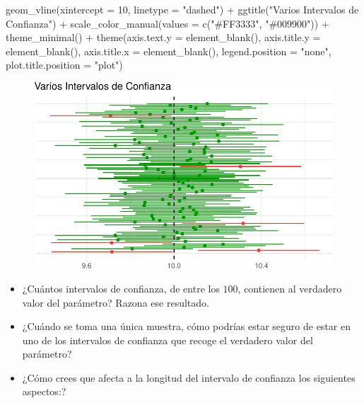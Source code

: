 \documentclass[
  letterpaper,
  DIV=11,
  numbers=noendperiod]{scrreprt}
\newenvironment{Shaded}{\begin{snugshade}}{\end{snugshade}}
\newcommand{\AttributeTok}[1]{\textcolor[rgb]{0.40,0.45,0.13}{#1}}
\newcommand{\DecValTok}[1]{\textcolor[rgb]{0.68,0.00,0.00}{#1}}
\newcommand{\FunctionTok}[1]{\textcolor[rgb]{0.28,0.35,0.67}{#1}}
\newcommand{\NormalTok}[1]{\textcolor[rgb]{0.00,0.23,0.31}{#1}}
\newcommand{\SpecialCharTok}[1]{\textcolor[rgb]{0.37,0.37,0.37}{#1}}
\newcommand{\StringTok}[1]{\textcolor[rgb]{0.13,0.47,0.30}{#1}}
\providecommand{\tightlist}{%
  \setlength{\itemsep}{0pt}\setlength{\parskip}{0pt}}\usepackage{longtable,booktabs,array}
\begin{document}
\begin{tcolorbox}
\begin{Shaded}
\begin{Highlighting}[]
  \FunctionTok{geom\_vline}\NormalTok{(}\AttributeTok{xintercept =} \DecValTok{10}\NormalTok{, }\AttributeTok{linetype =} \StringTok{"dashed"}\NormalTok{) }\SpecialCharTok{+}
  \FunctionTok{ggtitle}\NormalTok{(}\StringTok{"Varios Intervalos de Confianza"}\NormalTok{) }\SpecialCharTok{+}
  \FunctionTok{scale\_color\_manual}\NormalTok{(}\AttributeTok{values =} \FunctionTok{c}\NormalTok{(}\StringTok{"\#FF3333"}\NormalTok{, }\StringTok{"\#009900"}\NormalTok{)) }\SpecialCharTok{+}
  \FunctionTok{theme\_minimal}\NormalTok{() }\SpecialCharTok{+}
  \FunctionTok{theme}\NormalTok{(}\AttributeTok{axis.text.y =} \FunctionTok{element\_blank}\NormalTok{(), }
        \AttributeTok{axis.title.y =} \FunctionTok{element\_blank}\NormalTok{(),}
        \AttributeTok{axis.title.x =} \FunctionTok{element\_blank}\NormalTok{(),}
        \AttributeTok{legend.position =} \StringTok{"none"}\NormalTok{,}
        \AttributeTok{plot.title.position =} \StringTok{"plot"}\NormalTok{)}
\end{Highlighting}
\end{Shaded}

\begin{figure}[H]

{\centering \includegraphics{para_files/figure-pdf/ic1-1.pdf}

}

\end{figure}

\begin{itemize}
\tightlist
\item
  ¿Cuántos intervalos de confianza, de entre los \(100\), contienen al
  verdadero valor del parámetro? Razona ese resultado.
\item
  ¿Cuándo se toma una única muestra, cómo podrías estar seguro de estar
  en uno de los intervalos de confianza que recoge el verdadero valor
  del parámetro?
\item
  ¿Cómo crees que afecta a la longitud del intervalo de confianza los
  siguientes aspectos:?


\end{itemize}
\end{tcolorbox}
\end{document}
